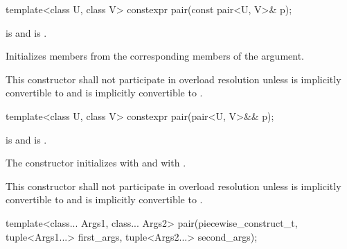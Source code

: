 \begin{itemdecl}
template<class U, class V> constexpr pair(const pair<U, V>& p);
\end{itemdecl}

\begin{itemdescr}
\pnum
\requires {} is 
and  is .

\pnum
\effects
Initializes members from the corresponding members of the argument.

\pnum
\remark This constructor shall not participate in overload resolution unless
 is implicitly convertible to  and
 is implicitly convertible to .
\end{itemdescr}

\begin{itemdecl}
template<class U, class V> constexpr pair(pair<U, V>&& p);
\end{itemdecl}

\begin{itemdescr}
\pnum
\requires {} is 
and  is .

\pnum
\effects
The constructor initializes  with
and  with
.

\pnum
\remark This constructor shall not participate in overload resolution unless
 is implicitly convertible to  and
 is implicitly convertible to .
\end{itemdescr}

\begin{itemdecl}
template<class... Args1, class... Args2>
  pair(piecewise_construct_t,
       tuple<Args1...> first_args, tuple<Args2...> second_args);
\end{itemdecl}

